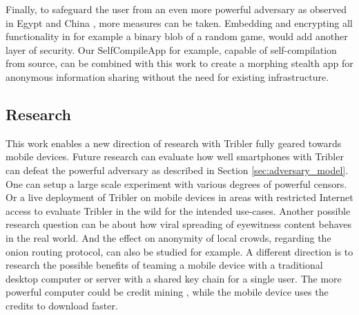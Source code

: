 Finally, to safeguard the user from an even more powerful adversary as observed in Egypt \cite{egypt_show_your_facebook_airport} and China \cite{nyt2015china}, more measures can be taken.
Embedding and encrypting all functionality in for example a binary blob of a random game, would add another layer of security.
Our SelfCompileApp \cite{brussee2015autonomous} for example, capable of self-compilation from source, can be combined with this work to create a morphing stealth app for anonymous information sharing without the need for existing infrastructure.

\subsection{Research}
This work enables a new direction of research with Tribler fully geared towards mobile devices.
Future research can evaluate how well smartphones with Tribler can defeat the powerful adversary as described in Section \ref{sec:adversary_model}.
One can setup a large scale experiment with various degrees of powerful censors.
Or a live deployment of Tribler on mobile devices in areas with restricted Internet access to evaluate Tribler in the wild for the intended use-cases.
Another possible research question can be about how viral spreading of eyewitness content behaves in the real world.
And the effect on anonymity of local crowds, regarding the onion routing protocol, can also be studied for example.
A different direction is to research the possible benefits of teaming a mobile device with a traditional desktop computer or server with a shared key chain for a single user.
The more powerful computer could be credit mining \cite{decentralized_credit_mining}, while the mobile device uses the credits to download faster.


